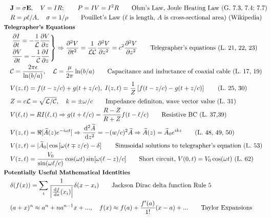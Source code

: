 \documentclass[10pt]{article}
\newcommand{\ve}[1]{\boldsymbol{\mathbf{#1}}}
\newcommand{\dd}{\, \mathrm{d}}
\newcommand{\tder}[2]{\frac{\dd #1}{\dd #2}}
\newcommand{\pder}[2]{\frac{\partial #1}{\partial #2}}
\newcommand{\dtder}[2]{\frac{\dd^2 #1}{\dd #2^2}}
\newcommand{\dpder}[2]{\frac{\partial^2 #1}{\partial #2^2}}
\newcommand{\lrb}[1]{\left[ #1 \right]}
\begin{document}
\begin{multicols}{2}
\begin{align*}
		& \ve{J} = \sigma \ve{E}, \quad V = IR; \qquad P = IV = I^2 R \tag*{Ohm's Law, Joule Heating Law (G. 7.3, 7.4; 7.7)} \\
		& R = \rho \ell / A, \quad \sigma = 1 / \rho	\tag*{Pouillet's Law ($\ell$ is length, $A$ is cross-sectional area) (Wikipedia)}\\
	& \small \hspace{-10pt} \textbf{Telegrapher's Equations} \small \\
		& \begin{drcases}
			\pder{I}{t} = -\frac{1}{\mathcal{L}} \pder{V}{z} \\
			\pder{V}{t} = - \frac{1}{\mathcal{C}} \pder{I}{z}\\
		\end{drcases} \Rightarrow \dpder{V}{t} = \frac{1}{\mathcal{LC}} \dpder{V}{z} = c^2 \dpder{V}{z} \tag*{Telegrapher's equations (L. 21, 22, 23)} \\
		& \mathcal{C} = \frac{2 \pi \epsilon}{\ln(b/a)}, \quad \mathcal{L} = \frac{\mu}{2 \pi} \ln(b/a) \tag*{Capacitance and inductance of coaxial cable (L. 17, 19)} \\
		& V(z,t) = f(t-z/c) + g(t+z/c), \; I(z,t) = \frac{1}{Z} \lrb{f(t-z/c) - g(t+z/c)} \tag*{(L. 25, 30)} \\
		& Z = c \mathcal{L} = \sqrt{\mathcal{L}/\mathcal{C}}, \quad k = \pm \omega/c \tag*{Impedance definiton, wave vector value (L. 31)} \\
		& V(\ell,t) = R I(\ell,t) \Rightarrow g(t+\ell/c) = \frac{R-Z}{R+Z} f(t-\ell/c) \tag*{Resistive BC (L. 37,39)}\\
		& V(z,t) = \Re[\widetilde{A}(z) e^{-i \omega t}] \Rightarrow \dtder{\widetilde{A}}{z} = -(w/c)^2 \widetilde{A} \Rightarrow \widetilde{A}(z) = \widetilde{A}_0 e^{ikz} \tag*{(L. 48, 49, 50)} \\
		& V(z,t) = |\widetilde{A}_0| \cos\lrb{\omega(t \mp z/c) -\delta} \tag*{Sinusoidal solutions to telegrapher's equation (L. 53)} \\
		& V(z,t) = \frac{V_0}{\sin(\omega \ell / c)} \cos (\omega t) \sin[\omega(\ell - z)/c] \tag*{Short circuit, $V(0,t) = V_0 \cos (\omega t)$ (L. 62)}\\
	& \small \hspace{-10pt} \textbf{Potentially Useful Mathematical Identities} \small \\
		& \delta(f(x)) = \sum_{i} \frac{1}{\left|\tder{f}{x}(x_i)\right|}\delta(x - x_i)	\tag*{Jackson Dirac delta function Rule 5 } \\
		& (a + x)^n \approx a^n + n a^{n-1} x+..., \quad f(x) \approx f(a) + \frac{f'(a)}{1!}(x-a)+... \tag*{Taylor Expansions} \\

\end{align*}
\end{multicols}
\end{document}
